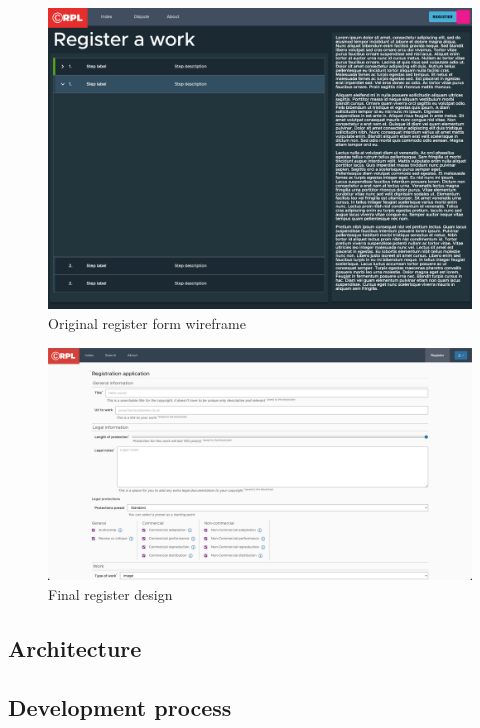\documentclass[12pt]{article}
\begin{document}
\begin{figure}[H]
\caption{Original register form wireframe}
\centering
\includegraphics[width=\textwidth,height=0.5\textheight,keepaspectratio]{images/wireframe/Register}
\end{figure}

\begin{figure}[H]
\caption{Final register design}
\centering
\includegraphics[width=\textwidth,height=0.5\textheight,keepaspectratio]{images/wireframe/register-real}
\end{figure}

\subsection{Architecture}

\subsection{Development process}
\end{document}
